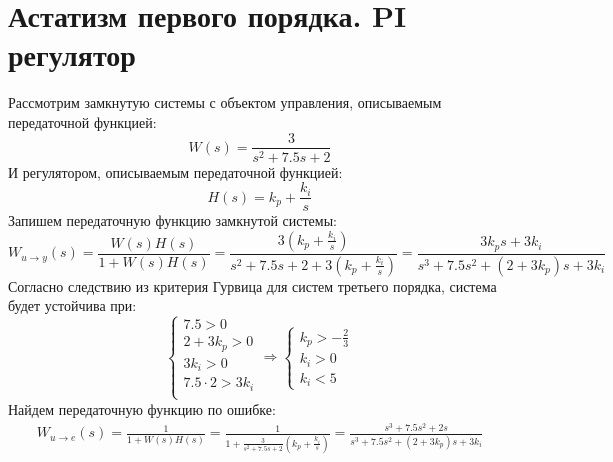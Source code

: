 \section{Астатизм первого порядка. PI регулятор}

Рассмотрим замкнутую системы с объектом управления, описываемым передаточной функцией:
\begin{equation}
    W(s) = \frac{3}{s^2 + 7.5s + 2}
\end{equation}
И регулятором, описываемым передаточной функцией:
\begin{equation}
   H(s) = k_p + \frac{k_i}{s}
\end{equation}
Запишем передаточную функцию замкнутой системы:
\begin{equation}
    W_{u\rightarrow y}(s) = \frac{W(s)H(s)}{1 + W(s)H(s)} = \frac{3(k_p + \frac{k_i}{s})}{s^2 + 7.5s + 2 + 3(k_p + \frac{k_i}{s})} = \frac{3k_p s + 3k_i}{s^3 + 7.5s^2 + (2 + 3k_p)s + 3k_i}
\end{equation}
Согласно следствию из критерия Гурвица для систем третьего порядка, система будет устойчива при:
\begin{equation}
    \begin{cases}
        7.5 > 0 \\ 
        2 + 3k_p > 0 \\ 
        3k_i > 0 \\ 
        7.5 \cdot 2 > 3k_i \\
    \end{cases}
    \Rightarrow
    \begin{cases}
        k_p > -\frac{2}{3} \\ 
        k_i > 0 \\ 
        k_i < 5
    \end{cases}
\end{equation}
Найдем передаточную функцию по ошибке:
\begin{multline}
    W_{u\rightarrow e}(s) = \frac{1}{1 + W(s)H(s)} = \frac{1}{1 + \frac{3}{s^2 + 7.5s + 2}( k_p + \frac{k_i}{s})} = \frac{s^3 + 7.5s^2 + 2s}{s^3 + 7.5s^2 + (2 + 3k_p)s + 3k_i} 
\end{multline}

